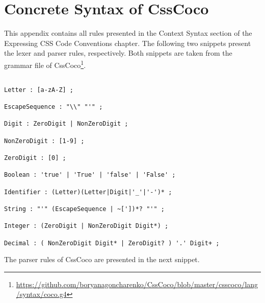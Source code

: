 \chapter{Concrete Syntax of CssCoco}

This appendix contains all rules presented in the Context Syntax section of the Expressing CSS Code Conventions chapter. The following two snippets present the lexer and parser rules, respectively. Both snippets are taken from the grammar file of CssCoco\footnote{\url{https://github.com/boryanagoncharenko/CssCoco/blob/master/csscoco/lang/syntax/coco.g4}}.

\begin{snippet}
\begin{verbatim}

Letter : [a-zA-Z] ;

EscapeSequence : "\\" "'" ;

Digit : ZeroDigit | NonZeroDigit ;

NonZeroDigit : [1-9] ;

ZeroDigit : [0] ;

Boolean : 'true' | 'True' | 'false' | 'False' ;

Identifier : (Letter)(Letter|Digit|'_'|'-')* ;

String : "'" (EscapeSequence | ~['])*? "'" ;

Integer : (ZeroDigit | NonZeroDigit Digit*) ;

Decimal : ( NonZeroDigit Digit* | ZeroDigit? ) '.' Digit+ ;

\end{verbatim}
\end{snippet}

The parser rules of CssCoco are presented in the next snippet.

